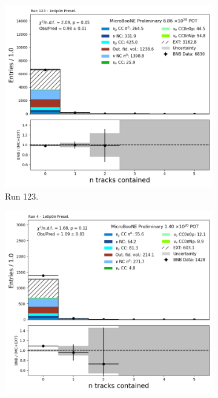 \begin{figure}[H]
    \centering
    \begin{subfigure}[t]{0.32\linewidth}
        \includegraphics[width=\linewidth]{technote/Appendix_Preselection/Figures/1e0p0pi/Run123/n_tracks_tot_Run123_1e0p0pi_Presel.png}
        \caption{Run 123.}
    \end{subfigure}%
    \hspace{0.2cm}%
    \begin{subfigure}[t]{0.32\linewidth}
        \includegraphics[width=\linewidth]{technote/Appendix_Preselection/Figures/1e0p0pi/Run4b/n_tracks_tot_Run4b_1e0p0pi_Presel.png}

\end{subfigure}
\end{figure}
